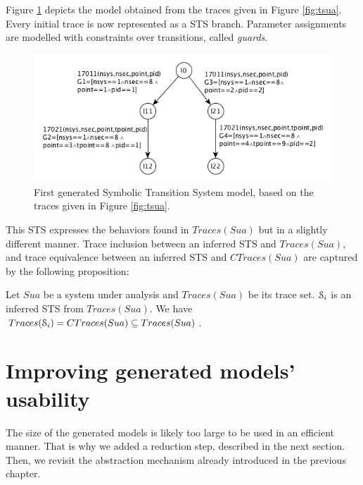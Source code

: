 Figure \ref{fig:firstmodel} depicts the model obtained from the
traces given in Figure \ref{fig:tsua}. Every initial trace is now
represented as a STS branch. Parameter assignments are modelled
with constraints over transitions, called \textit{guards}.

\begin{figure}[ht]
  \includegraphics[width=1.0\linewidth]{figures/STS1.png}

  \caption{First generated Symbolic Transition System model,
  based on the traces given in Figure \ref{fig:tsua}.}
  \label{fig:firstmodel}
\end{figure}

This STS expresses the behaviors found in $Traces(Sua)$ but in a
slightly different manner. Trace inclusion \cite{petrenko06}
between an inferred STS and $Traces(Sua)$, and trace equivalence
\cite{petrenko06} between an inferred STS and $CTraces(Sua)$ are
captured by the following proposition:

\begin{proposition}
    Let $\mathit{Sua}$ be a system under analysis and $Traces(Sua)$ be its
    trace set. $\EuScript{S}_i$ is an inferred STS from
    $Traces(Sua)$.
    We have $Traces(\EuScript{S}_i) = CTraces(Sua) \subseteq Traces(Sua)$.

	\label{def:equivtraces_IOSTS}
\end{proposition}


\section{Improving generated models' usability}
\label{sec:modelinf:usability}

The size of the generated models is likely too large to be used
in an efficient manner. That is why we added a reduction step,
described in the next section. Then, we revisit the abstraction
mechanism already introduced in the previous chapter.

